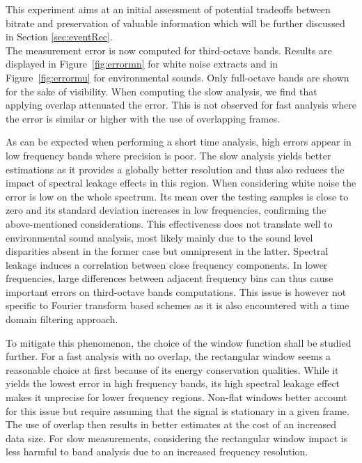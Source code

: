 \documentclass[sensors,article,submit,moreauthors,pdftex,10pt,a4paper]{mdpi}
\begin{document}

This experiment aims at an initial assessment of potential tradeoffs between bitrate and preservation of valuable information which will be further discussed in Section \ref{sec:eventRec}.\\

The measurement error is now computed for third-octave bands. Results are displayed in Figure~\ref{fig:errormn} for white noise extracts and in Figure~\ref{fig:errormu} for environmental sounds. Only full-octave bands are shown for the sake of visibility. When computing the slow analysis, we find that applying overlap attenuated the error. This is not observed for fast analysis where the error is similar or higher with the use of overlapping frames.

As can be expected when performing a short time analysis, high errors appear in low frequency bands where precision is poor. The slow analysis yields better estimations as it provides a globally better resolution and thus also reduces the impact of spectral leakage effects in this region. When considering white noise the error is low on the whole spectrum. Its mean over the testing samples is close to zero and its standard deviation increases in low frequencies, confirming the above-mentioned considerations. This effectiveness does not translate well to environmental sound analysis, most likely mainly due to the sound level disparities absent in the former case but omnipresent in the latter. Spectral leakage induces a correlation between close frequency components. In lower frequencies, large differences between adjacent frequency bins can thus cause important errors on third-octave bands computations. This issue is however not specific to Fourier transform based schemes as it is also encountered with a time domain filtering approach.

To mitigate this phenomenon, the choice of the window function shall be studied further. For a fast analysis with no overlap, the rectangular window seems a reasonable choice at first because of its energy conservation qualities. While it yields the lowest error in high frequency bands, its high spectral leakage effect makes it unprecise for lower frequency regions. Non-flat windows better account for this issue but require assuming that the signal is stationary in a given frame. The use of overlap then results in better estimates at the cost of an increased data size. For slow measurements, considering the rectangular window impact is less harmful to band analysis due to an increased frequency resolution.
\end{document}
